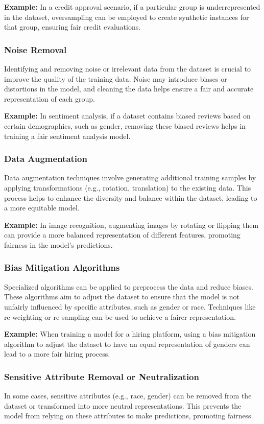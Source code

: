 \documentclass[12pt,a4paper,openright,twoside]{book}
\begin{document}
\textbf{Example:} In a credit approval scenario, if a particular group is underrepresented in the dataset, oversampling can be employed to create synthetic instances for that group, ensuring fair credit evaluations.

\subsubsection{Noise Removal}
Identifying and removing noise or irrelevant data from the dataset is crucial to improve the quality of the training data. Noise may introduce biases or distortions in the model, and cleaning the data helps ensure a fair and accurate representation of each group.

\textbf{Example:} In sentiment analysis, if a dataset contains biased reviews based on certain demographics, such as gender, removing these biased reviews helps in training a fair sentiment analysis model.

\subsubsection{Data Augmentation}
Data augmentation techniques involve generating additional training samples by applying transformations (e.g., rotation, translation) to the existing data. This process helps to enhance the diversity and balance within the dataset, leading to a more equitable model.

\textbf{Example:} In image recognition, augmenting images by rotating or flipping them can provide a more balanced representation of different features, promoting fairness in the model's predictions.

\subsubsection{Bias Mitigation Algorithms}
Specialized algorithms can be applied to preprocess the data and reduce biases. These algorithms aim to adjust the dataset to ensure that the model is not unfairly influenced by specific attributes, such as gender or race. Techniques like re-weighting or re-sampling can be used to achieve a fairer representation.

\textbf{Example:} When training a model for a hiring platform, using a bias mitigation algorithm to adjust the dataset to have an equal representation of genders can lead to a more fair hiring process.

\subsubsection{Sensitive Attribute Removal or Neutralization}
In some cases, sensitive attributes (e.g., race, gender) can be removed from the dataset or transformed into more neutral representations. This prevents the model from relying on these attributes to make predictions, promoting fairness.
\end{document}
